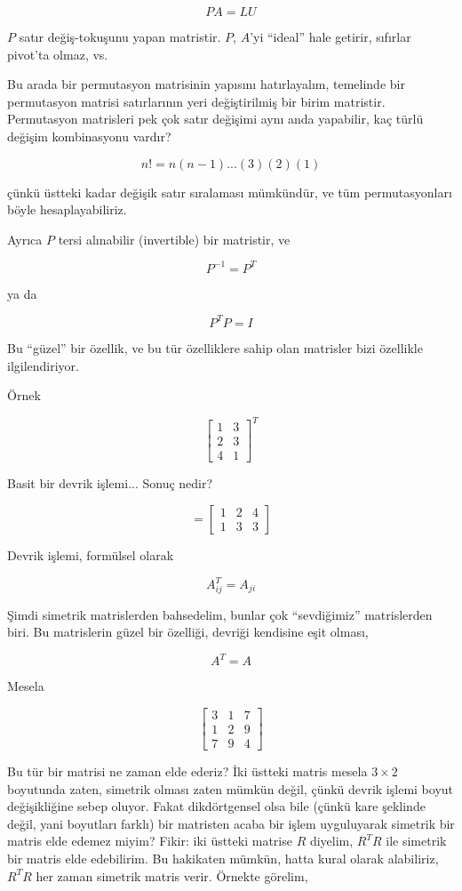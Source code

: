 \documentclass[12pt,fleqn]{article}\usepackage{../../common}
\begin{document}
$$
PA = LU
$$

$P$ satır değiş-tokuşunu yapan matristir. $P$, $A$'yi ``ideal'' hale
getirir, sıfırlar pivot'ta olmaz, vs. 

Bu arada bir permutasyon matrisinin yapısını hatırlayalım, temelinde bir
permutasyon matrisi satırlarının yeri değiştirilmiş bir birim
matristir. Permutasyon matrisleri pek çok satır değişimi aynı anda
yapabilir, kaç türlü değişim kombinasyonu vardır? 

$$
n! = n(n-1)...(3)(2)(1)
$$

çünkü üstteki kadar değişik satır sıralaması mümkündür, ve tüm
permutasyonları böyle hesaplayabiliriz. 

Ayrıca $P$ tersi alınabilir (invertible) bir matristir, ve 

$$
P^{-1} = P^T
$$

ya da 

$$
P^TP = I
$$

Bu ``güzel'' bir özellik, ve bu tür özelliklere sahip olan matrisler bizi
özellikle ilgilendiriyor.

Örnek

$$ 
\left[\begin{array}{cc}
1 & 3 \\
2 & 3 \\
4 & 1 
\end{array}\right]^T
$$

Basit bir devrik işlemi... Sonuç nedir?

$$ =
\left[\begin{array}{ccc}
1 & 2 & 4 \\
1 & 3 & 3 
\end{array}\right]
$$

Devrik işlemi, formülsel olarak 

$$
A_{ij}^T = A_{ji}
$$

Şimdi simetrik matrislerden bahsedelim, bunlar çok ``sevdiğimiz''
matrislerden biri. Bu matrislerin güzel bir özelliği, devriği kendisine
eşit olması,

$$
A^T = A
$$

Mesela

$$ 
\left[\begin{array}{ccc}
3 & 1 & 7 \\
1 & 2 & 9 \\
7 & 9 & 4
\end{array}\right]
$$

Bu tür bir matrisi ne zaman elde ederiz? İki üstteki matris mesela
$3 \times 2$ boyutunda zaten, simetrik olması zaten mümkün değil, çünkü devrik
işlemi boyut değişikliğine sebep oluyor. Fakat dikdörtgensel olsa bile
(çünkü kare şeklinde değil, yani boyutları farklı) bir matristen acaba bir
işlem uyguluyarak simetrik bir matris elde edemez miyim? Fikir: iki üstteki
matrise $R$ diyelim, $R^TR$ ile simetrik bir matris elde edebilirim. Bu
hakikaten mümkün, hatta kural olarak alabiliriz, $R^TR$ her zaman simetrik
matris verir. Örnekte görelim, 
\end{document}
